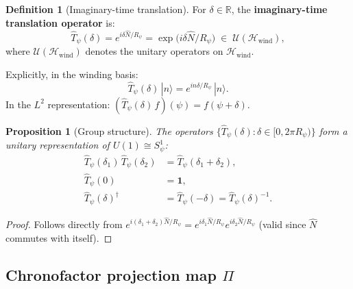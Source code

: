 \documentclass[12pt,a4paper]{article}
\newtheorem{proposition}[theorem]{Proposition}
\theoremstyle{definition}
\newtheorem{definition}[theorem]{Definition}
\theoremstyle{remark}
\begin{document}
\begin{definition}[Imaginary-time translation]
\label{def:chron:Tpsi}
For $\delta \in \mathbb{R}$, the \textbf{imaginary-time translation operator} is:
\begin{equation}
  \hat{T}_\psi(\delta)
  = e^{i\delta\hat{N}/R_\psi}
  = \exp\!\bigl(i\delta\hat{N}/R_\psi\bigr)
  \;\in\; \mathcal{U}(\mathcal{H}_{\mathrm{wind}}),
  \label{eq:chron:Tpsi}
\end{equation}
where $\mathcal{U}(\mathcal{H}_{\mathrm{wind}})$ denotes the unitary operators on
$\mathcal{H}_{\mathrm{wind}}$.

Explicitly, in the winding basis:
\begin{equation}
  \hat{T}_\psi(\delta)\,|n\rangle
  = e^{in\delta/R_\psi}\,|n\rangle.
  \label{eq:chron:Tpsi_action}
\end{equation}
In the $L^2$ representation: $(\hat{T}_\psi(\delta)\,f)(\psi) = f(\psi + \delta)$.
\end{definition}

\begin{proposition}[Group structure]
\label{prop:chron:group}
The operators $\{\hat{T}_\psi(\delta) : \delta \in [0, 2\pi R_\psi)\}$ form a
unitary representation of $U(1) \cong S^1_\psi$:
\begin{align}
  \hat{T}_\psi(\delta_1)\,\hat{T}_\psi(\delta_2) &= \hat{T}_\psi(\delta_1 + \delta_2),
  \label{eq:chron:T_group1}\\
  \hat{T}_\psi(0) &= \mathbf{1},
  \label{eq:chron:T_group2}\\
  \hat{T}_\psi(\delta)^\dagger &= \hat{T}_\psi(-\delta) = \hat{T}_\psi(\delta)^{-1}.
  \label{eq:chron:T_group3}
\end{align}
\end{proposition}

\begin{proof}
Follows directly from $e^{i(\delta_1+\delta_2)\hat{N}/R_\psi} = e^{i\delta_1\hat{N}/R_\psi}e^{i\delta_2\hat{N}/R_\psi}$
(valid since $\hat{N}$ commutes with itself).
\end{proof}

\subsection{Chronofactor projection map $\Pi$}
\end{document}
